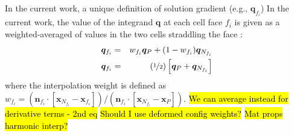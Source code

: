 \documentclass[sn-mathphys,Numbered]{sn-jnl}%
\newcommand{\bb}{\boldsymbol}
\begin{document}
In the current work, a unique definition of solution gradient (e.g., $\bb{q}_{f_i}$)
In the current work, the value of the integrand $\bb{q}$ at each cell face $f_i$ is given as a weighted-averaged of values in the two cells straddling the face \citep{Cardiff2025JFNK, Jasak1996}:
\begin{eqnarray} \label{eq:face_interp}
	\bb{q}_{f_i} &=& w_{f_i} \bb{q}_P + (1 - w_{f_i}) \bb{q}_{N_{f_i}} \\
	\bb{q}_{f_i} &=& \left( \nicefrac{1}{2} \right) \left[ \bb{q}_P +  \bb{q}_{N_{f_i}} \right]
\end{eqnarray}
where the interpolation weight is defined as $w_{f_i} = (\bb{n}_{f_i} \cdot [\bb{x}_{N_{f_i}} - \bb{x}_{f_i}])/(\bb{n}_{f_i} \cdot [\bb{x}_{N_{f_i}} - \bb{x}_{P} ])$.
\hl{We can average instead for derivative terms - 2nd eq}
\hl{Should I use deformed config weights?}
\hl{Mat props harmonic interp?}

\end{document}
